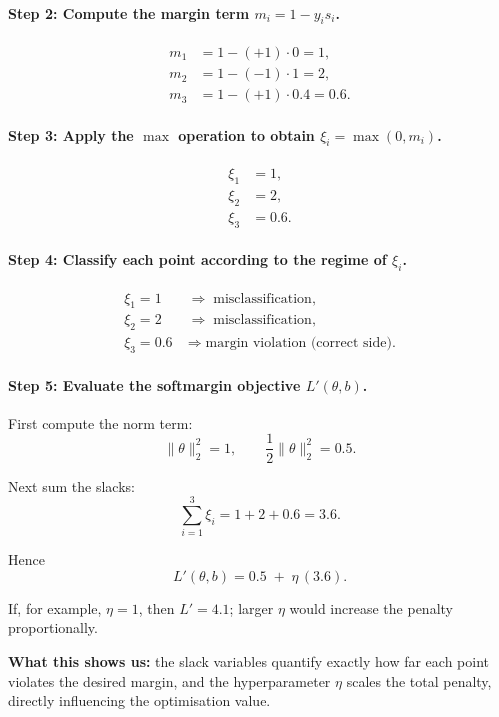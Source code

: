 \documentclass[12pt, a4paper]{article}
\begin{document}
\paragraph{Step 2: Compute the margin term \(m_i = 1 - y_i s_i\).}
\[
\begin{aligned}
m_1 &= 1 - (+1)\cdot 0 = 1,\\
m_2 &= 1 - (-1)\cdot 1 = 2,\\
m_3 &= 1 - (+1)\cdot 0.4 = 0.6.
\end{aligned}
\]

\paragraph{Step 3: Apply the \(\max\) operation to obtain \(\xi_i = \max(0,m_i)\).}
\[
\begin{aligned}
\xi_1 &= 1,\\
\xi_2 &= 2,\\
\xi_3 &= 0.6.
\end{aligned}
\]

\paragraph{Step 4: Classify each point according to the regime of \(\xi_i\).}
\[
\begin{aligned}
\xi_1 = 1   &\;\Rightarrow\; \text{misclassification},\\
\xi_2 = 2   &\;\Rightarrow\; \text{misclassification},\\
\xi_3 = 0.6 &\;\Rightarrow\; \text{margin violation (correct side).}
\end{aligned}
\]

\paragraph{Step 5: Evaluate the softmargin objective \(L'(\theta,b)\).}
First compute the norm term:
\[
\|\theta\|_2^{2}=1,\qquad \frac{1}{2}\|\theta\|_2^{2}=0.5.
\]

Next sum the slacks:
\[
\sum_{i=1}^{3}\xi_i = 1 + 2 + 0.6 = 3.6.
\]

Hence
\[
L'(\theta,b)=0.5\;+\;\eta\,(3.6).
\]

If, for example, \(\eta=1\), then \(L' = 4.1\); larger \(\eta\) would increase the penalty proportionally.

\textbf{What this shows us:} the slack variables quantify exactly how far each point violates the desired margin, and the hyperparameter \(\eta\) scales the total penalty, directly influencing the optimisation value.
\end{document}
